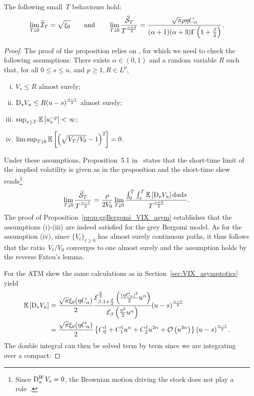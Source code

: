 \begin{proposition}\label{prop:ggBergomi_SPX_asym}
The following small~$T$ behaviours hold:
$$
\lim _{T \downarrow 0} \widehat{\mathcal{I}}_T = \sqrt{\xi_0}
\qquad\text{and}\qquad
\lim_{T\downarrow 0} \frac{\widehat{\mathcal{S}}_T}{T^{\frac{\alpha+3}{2}}} = \frac{\sqrt{\pi}\rho \eta C_\alpha}{(\alpha+1)(\alpha+3)\Gamma\left(1+\frac{\beta}{2}\right)}.
$$
\end{proposition}
\begin{proof}
The proof of the proposition relies on
\cite[Proposition~5.1]{Jacquier2021RoughOptions}, for which we need to check the following assumptions:
    There exists $\alpha \in\left(0, 1\right)$ and a random variable $R$ such that, for all $0 \leq s \leq u$, %
    and $p \geq 1, R \in L^p$,
    \begin{enumerate}[(i)]
        \item $V_s \leq R$ almost surely;
        \item $\mathrm{D}_s V_u \leq R(u-s)^{\frac{\alpha-1}{2}}$ almost surely;
        \item $\sup _{s \leq T} \mathbb{E}\left[u_s^{-p}\right]<\infty$;
        \item $\limsup _{T \downarrow 0} \mathbb{E}\left[\left(\sqrt{V_T / V_0}-1\right)^2\right]=0$.
    \end{enumerate}
Under these assumptions, Proposition~5.1 in~\cite{Jacquier2021RoughOptions} states that the short-time limit of the implied volatility is given as in the proposition and the short-time skew reads\footnote{Since $\mathrm{D}^W_u V_s = 0$, the Brownian motion driving the stock does not play a role~\cite[Section~5]{Jacquier2021RoughOptions}.}
\[
\lim _{T \downarrow 0} \frac{\widehat{\mathcal{S}}_T}{T^{\frac{\alpha-1}{2}}}
 = \frac{\rho}{2 V_0}
     \lim _{T \downarrow 0} \frac{\int_0^T \int_s^T \mathbb{E}\left[\mathrm{D}_s V_u\right] \mathrm{d} u \mathrm{d} s}{T^{\frac{\alpha+3}2}}.
\]
The proof of Proposition~\ref{prop:ggBergomi_VIX_asym} establishes that the assumptions (i)-(iii) are indeed satisfied for the grey Bergomi model. As for the assumption (iv), since $\{V_t\}_{t\geq 0}$ has almost surely continuous paths, it thus follows that the ratio~$V_t/V_0$ converges to one almost surely and the assumption holds by the reverse Fatou's lemma. 

For the ATM skew the same calculations as in Section~\ref{sec:VIX_asymptotics} yield
\begin{align}
    \mathbb{E}\left[\mathrm{D}_s V_u\right] &= \frac{\sqrt{\pi} \xi_0 (\eta C_\alpha)}{2} \frac{\mathcal{E}_{\beta, 1 + \frac\beta2}^{\frac32} \left(\frac{(\eta C_{\alpha})^2}2 u^\alpha\right)}{\mathcal{E}_{\beta}\left(\frac{\eta^2}2 u^\alpha\right)} (u-s)^{\frac{\alpha-1}{2}} \\
    &= \frac{\sqrt{\pi} \xi_0 (\eta C_\alpha)}{2} \left\{ C_0^1 + C_1^1 u^\alpha + C_2^1 u^{2\alpha} + \mathcal{O}\left(u^{3\alpha}\right)\right\} (u-s)^{\frac{\alpha-1}{2}}.
\end{align}
The double integral can then be solved term by term since we are integrating over a compact:


\end{proof}
